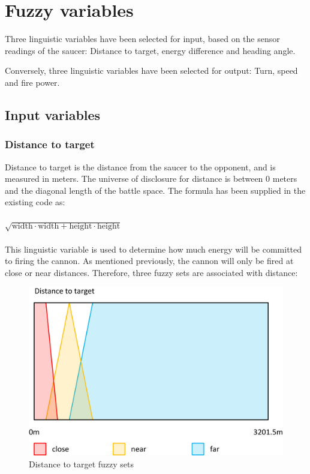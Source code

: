 \newpage

\section{Fuzzy variables}

Three linguistic variables have been selected for input, based on the sensor readings of the saucer: Distance to target, energy difference and heading angle.

Conversely, three linguistic variables have been selected for output: Turn, speed and fire power.

\subsection{Input variables}

\subsubsection{Distance to target}

Distance to target is the distance from the saucer to the opponent, and is measured in meters. The universe of disclosure for distance is between 0 meters and the diagonal length of the battle space. The formula has been supplied in the existing code as:
\\
\\
$\sqrt{\mbox{width} \cdot \mbox{width} + \mbox{height} \cdot \mbox{height}}$
\\
\\
This linguistic variable is used to determine how much energy will be committed to firing the cannon. As mentioned previously, the cannon will only be fired at close or near distances. Therefore, three fuzzy sets are associated with distance:

\begin{figure}[H]
\centering
\caption{Distance to target fuzzy sets}
\includegraphics[scale=0.1]{./img/pdf/distanceSets.pdf}
\end{figure}

